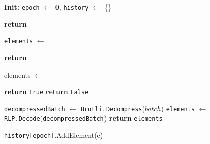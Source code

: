 \begin{figure}[t!]
  \begin{adjustbox}{minipage=[t]{\columnwidth}}
    \begin{algorithm}[H]
      \renewcommand{\thealgorithm}{Compresschain ABCI}         
      \caption{\small }%
      \label{alg:abci-brotli}%
      \small
      \begin{algorithmic}[1]
            \State \textbf{Init:} \texttt{epoch} $\leftarrow$ \textbf{0}, \texttt{history} $\leftarrow$ \{\}

            \label{alg:brotli_check_tx}
                \State \textbf{return} 
            \EndFunction
      
            \label{alg:brotli_deliver_tx}
				\State \texttt{elements} $\leftarrow$ 
				\State {}
            		
            		\State \textbf{return}
            \EndFunction
            
            \label{alg:brotli_is_valid}
            		\State elements $\leftarrow$ 
            		
                    		\State \textbf{return} \texttt{True}
                    \EndIf
                \EndFor
                \State \textbf{return} \texttt{False}
            \EndFunction
            
            \label{alg:brotli_get_element}
                \State \texttt{decompressedBatch} $\leftarrow$ \texttt{Brotli.Decompress}($batch$)
                \State \texttt{elements} $\leftarrow$ \texttt{RLP.Decode}(\texttt{decompressedBatch})
                \State \textbf{return} \texttt{elements}
            \EndFunction
            
            \label{alg:brotli_new_epoch}
                				\State \texttt{history[epoch]}.AddElement(e)
                    	 \EndIf
                	\EndFor
                	

\end{algorithmic}
\end{algorithm}
\end{adjustbox}
\end{figure}
